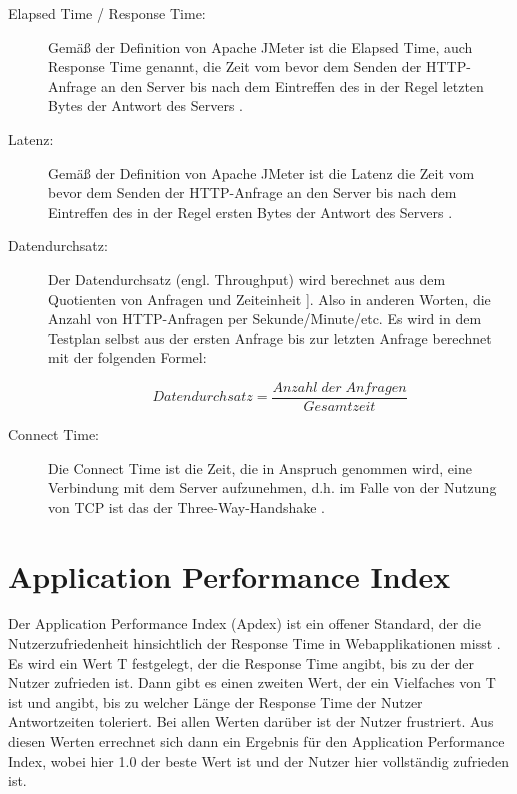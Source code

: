 \begin{description}
  \item[Elapsed Time / Response Time:] Gemäß der Definition von Apache JMeter ist die Elapsed Time, auch Response Time 
  genannt, die Zeit vom bevor dem Senden der HTTP-Anfrage an den Server bis nach dem 
  Eintreffen des in der Regel letzten Bytes der Antwort des Servers \citep{jmeterglossary:2021}. 
  \item[Latenz:] Gemäß der Definition von Apache JMeter ist die Latenz die Zeit vom bevor dem Senden der 
  HTTP-Anfrage an den Server bis nach dem Eintreffen des in der Regel ersten Bytes der 
  Antwort des Servers \citep{jmeterglossary:2021}. 
  \item[Datendurchsatz:] Der Datendurchsatz (engl. Throughput) wird berechnet aus dem Quotienten von Anfragen 
  und Zeiteinheit \citep{jmeterglossary:2021}]. Also in anderen Worten, die Anzahl von HTTP-Anfragen per 
  Sekunde/Minute/etc. Es wird in dem Testplan selbst aus der ersten Anfrage bis zur letzten 
  Anfrage berechnet mit der folgenden Formel:

  \begin{equation}
    Datendurchsatz = \frac{Anzahl\;der\;Anfragen}{Gesamtzeit} 
  \end{equation}

  \item[Connect Time:] Die Connect Time ist die Zeit, die in Anspruch genommen wird, eine Verbindung mit dem 
  Server aufzunehmen, d.h. im Falle von der Nutzung von TCP ist das der Three-Way-Handshake \citep{jmeterglossary:2021}. 
\end{description}

\section{Application Performance Index}
Der Application Performance Index (Apdex) ist ein offener Standard, der die Nutzerzufriedenheit 
hinsichtlich der Response Time in Webapplikationen misst \citep{apdex:2007}. Es wird ein Wert T 
festgelegt, der die Response Time angibt, bis zu der der Nutzer zufrieden ist. Dann gibt es 
einen zweiten Wert, der ein Vielfaches von T ist und angibt, bis zu welcher Länge der 
Response Time der Nutzer Antwortzeiten toleriert. Bei allen Werten darüber ist der Nutzer 
frustriert. Aus diesen Werten errechnet sich dann ein Ergebnis für den Application 
Performance Index, wobei hier 1.0 der beste Wert ist und der Nutzer hier vollständig 
zufrieden ist.\smallskip

